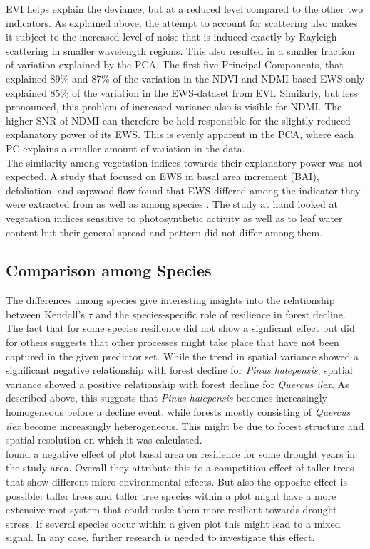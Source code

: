 EVI helps explain the deviance, but at a reduced level compared to the other two indicators. As explained above, the attempt to account for scattering also makes it subject to the increased level of noise that is induced exactly by Rayleigh-scattering in smaller wavelength regions. This also resulted in a smaller fraction of variation explained by the PCA. The first five Principal Components, that explained 89\% and 87\% of the variation in the NDVI and NDMI based EWS only explained 85\% of the variation in the EWS-dataset from EVI. Similarly, but less pronounced, this problem of increased variance also is visible for NDMI. The higher SNR of NDMI can therefore be held responsible for the slightly reduced explanatory power of its EWS. This is evenly apparent in the PCA, where each PC explains a smaller amount of variation in the data.\\
The similarity among vegetation indices towards their explanatory power was not expected. A study that focused on EWS in basal area increment (BAI), defoliation, and sapwood flow found that EWS differed among the indicator they were extracted from as well as among species \citep{camarero2015}. The study at hand looked at vegetation indices sensitive to photosynthetic activity as well as to leaf water content but their general spread and pattern did not differ among them. \\



\subsection{Comparison among Species}
The differences among species give interesting insights into the relationship between Kendall's $\tau$ and the species-specific role of resilience in forest decline. The fact that for some species resilience did not show a signficant effect but did for others suggests that other processes might take place that have not been captured in the given predictor set. While the trend in spatial variance showed a significant negative relationship with forest decline for \textit{Pinus halepensis}, spatial variance showed a positive relationship with forest decline for \textit{Quercus ilex}. As described above, this suggests that \textit{Pinus halepensis} becomes increasingly homogeneous before a decline event, while forests mostly consisting of \textit{Quercus ilex} become increasingly heterogeneous. This might be due to forest structure and spatial resolution on which it was calculated.\\
\cite{serra2018} found a negative effect of plot basal area on resilience for some drought years in the study area. Overall they attribute this to a competition-effect of taller trees that show different micro-environmental effects. But also the opposite effect is possible: taller trees and taller tree species within a plot might have a more extensive root system that could make them more resilient towards drought-stress. If several species occur within a given plot this might lead to a mixed signal. In any case, further research is needed to investigate this effect.\\
